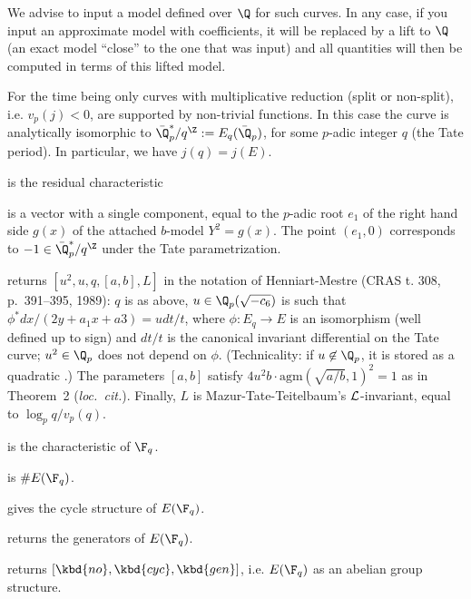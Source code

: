 
We advise to input a model defined over $\Q$ for such curves. In any case,
if you input an approximate model with  coefficients, it will be
replaced by a lift to $\Q$ (an exact model ``close'' to the one that was
input) and all quantities will then be computed in terms of this lifted
model.

For the time being only curves with multiplicative reduction (split or
non-split), i.e. $v_p(j) < 0$, are supported by non-trivial functions. In
this case the curve is analytically isomorphic to $\bar{\Q}_p^*/q^\Z :=
E_q(\bar{\Q}_p)$, for some $p$-adic integer $q$ (the Tate period). In
particular, we have $j(q) = j(E)$.

\item {} is the residual characteristic

\item {} is a vector with a single component, equal to the $p$-adic
root $e_1$ of the right hand side $g(x)$ of the attached $b$-model $Y^2
= g(x)$. The point $(e_1,0)$ corresponds to $-1 \in \bar{\Q}_p^*/q^\Z$
under the Tate parametrization.

\item {} returns $[u^2,u,q,[a,b],L]$ in the notation of Henniart-Mestre
(CRAS t. 308, p.~391--395, 1989): $q$ is as above, $u\in \Q_p(\sqrt{-c_6})$
is such that $\phi^* dx/(2y + a_1x+a3) = u dt/t$, where $\phi: E_q\to E$
is an isomorphism (well defined up to sign) and $dt/t$ is the canonical
invariant differential on the Tate curve; $u^2\in\Q_p$ does not depend on
$\phi$. (Technicality: if $u\not\in\Q_p$, it is stored as a quadratic
.)
The parameters $[a,b]$ satisfy $4u^2 b \cdot \text{agm}(\sqrt{a/b},1)^2 = 1$
as in Theorem~2 (\emph{loc.~cit.}).
Finally, $L$ is Mazur-Tate-Teitelbaum's ${\cal L}$-invariant, equal
to $\log_p q / v_p(q)$.


\item {} is the characteristic of $\F_q$.

\item {} is $\#E(\F_q)$.

\item {} gives the cycle structure of $E(\F_q)$.

\item {} returns the generators of $E(\F_q)$.

\item {} returns $[\kbd{no},\kbd{cyc},\kbd{gen}]$, i.e. $E(\F_q)$
as an abelian group structure.


